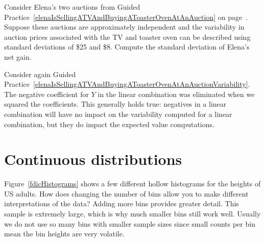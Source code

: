 \begin{exercisewrap}
\begin{nexercise}\label{elenaIsSellingATVAndBuyingAToasterOvenAtAnAuctionVariability}
Consider Elena's two auctions from Guided Practice~\ref{elenaIsSellingATVAndBuyingAToasterOvenAtAnAuction} on page~\pageref{elenaIsSellingATVAndBuyingAToasterOvenAtAnAuction}. Suppose these auctions are approximately independent and the variability in auction prices associated with the TV and toaster oven can be described using standard deviations of \$25 and \$8. Compute the standard deviation of Elena's net gain.\footnotemark
\end{nexercise}
\end{exercisewrap}

Consider again Guided Practice~\ref{elenaIsSellingATVAndBuyingAToasterOvenAtAnAuctionVariability}. The negative coefficient for $Y$ in the linear combination was eliminated when we squared the coefficients. This generally holds true: negatives in a linear combination will have no impact on the variability computed for a linear combination, but they do impact the expected value computations.


\section{Continuous distributions}
\label{contDist}

\begin{examplewrap}
\begin{nexample}{Figure~\ref{fdicHistograms} shows a few
    different hollow histograms for the heights of US adults.
    How does changing the number of bins allow you to make
    different interpretations of the data?}
  \label{usHeights}%
  Adding more bins provides greater detail.
  This sample is extremely large, which is why much smaller
  bins still work well.
  Usually we do not use so many bins with smaller sample
  sizes since small counts per bin mean the bin heights
  are very volatile.
\end{nexample}
\end{examplewrap}

